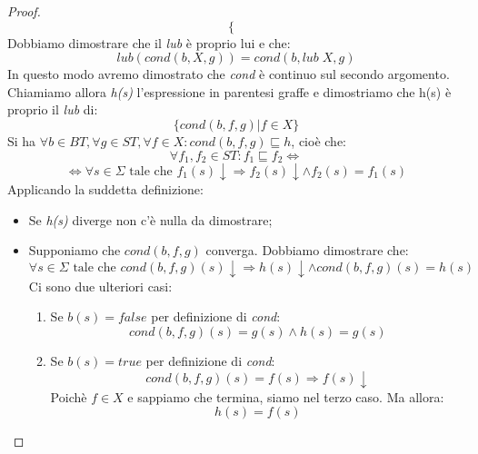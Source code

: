 \begin{proof}
$$\begin{cases}
  \end{cases} $$
  Dobbiamo dimostrare che il \emph{lub} è proprio lui e che:
  $$ lub(cond(b,X,g)) = cond(b, lub\; X, g) $$
  In questo modo avremo dimostrato che \emph{cond} è continuo sul secondo argomento. Chiamiamo allora \emph{h(s)} l'espressione in parentesi graffe e dimostriamo che h(s) è proprio il \emph{lub} di:
  $$ \{cond(b,f,g) | f \in X \} $$
  Si ha $ \forall b \in BT, \forall g \in ST, \forall f \in X : cond(b,f,g) \sqsubseteq h $, cioè che:
  $$ \forall f_1, f_2 \in ST : f_1 \sqsubseteq f_2 \Leftrightarrow $$
  $$ \Leftrightarrow \forall s \in \Sigma \mbox{ tale che } f_{1}(s) \downarrow \Rightarrow f_{2}(s) \downarrow \land f_{2}(s) = f_{1}(s) $$
  Applicando la suddetta definizione:
  \begin{itemize}
  \item Se \emph{h(s)} diverge non c'è nulla da dimostrare;
  \item Supponiamo che $cond(b,f,g)$ converga. Dobbiamo dimostrare che:
    $$ \forall s \in \Sigma \mbox{ tale che } cond(b,f,g)(s) \downarrow \Rightarrow h(s) \downarrow \land cond(b,f,g)(s) = h(s) $$
    Ci sono due ulteriori casi:
    \begin{enumerate}
    \item Se $b(s) = false$ per definizione di \emph{cond}:
      $$ cond(b,f,g)(s) = g(s) \land h(s) = g(s) $$
    \item Se $b(s)=true$ per definizione di \emph{cond}:
      $$ cond(b,f,g)(s) = f(s) \Rightarrow f(s) \downarrow $$
      Poichè $f \in X$ e sappiamo che termina, siamo nel terzo caso. Ma allora:
      $$ h(s) = f(s) $$
    \end{enumerate}
  \end{itemize}


\end{proof}
